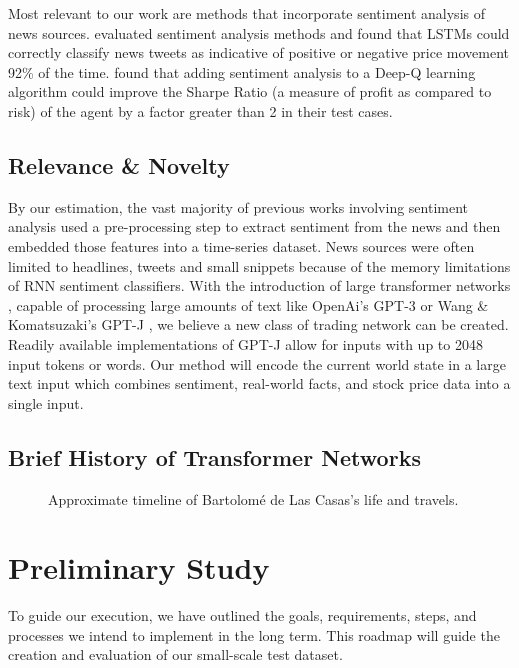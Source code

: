 \documentclass[conference]{IEEEtran}
\begin{document}
Most relevant to our work are methods that incorporate sentiment analysis of news sources. \cite{Mehta2021} evaluated sentiment analysis methods and found that LSTMs could correctly classify news tweets as indicative of positive or negative price movement 92\% of the time. \cite{Nan2020} found that adding sentiment analysis to a Deep-Q learning algorithm could improve the Sharpe Ratio (a measure of profit as compared to risk) of the agent by a factor greater than 2 in their test cases.

\subsection{Relevance \& Novelty}
By our estimation, the vast majority of previous works involving sentiment analysis used a pre-processing step to extract sentiment from the news and then embedded those features into a time-series dataset. News sources were often limited to headlines, tweets and small snippets because of the memory limitations of RNN sentiment classifiers. With the introduction of large transformer networks \cite{Vaswani2017}, capable of processing large amounts of text like OpenAi's GPT-3 \cite{Brown2020} or Wang \& Komatsuzaki's GPT-J \cite{gpt-j}, we believe a new class of trading network can be created. Readily available implementations of GPT-J allow for inputs with up to 2048 input tokens or words. Our method will encode the current world state in a large text input which combines sentiment, real-world facts, and stock price data into a single input.

\subsection{Brief History of Transformer Networks}
\begin{figure}[ht]
    \noindent{}
    \caption[Timeline]{Approximate timeline of Bartolomé de Las Casas's life and travels.}
\end{figure}
\section{Preliminary Study}
To guide our execution, we have outlined the goals, requirements, steps, and processes we intend to implement in the long term. This roadmap will guide the creation and evaluation of our small-scale test dataset.
\end{document}

